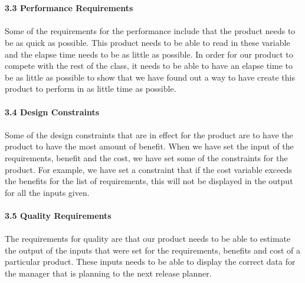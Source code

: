 \documentclass{article}
\begin{document}
\\
\\
\textbf{\hspace{4ex} 3.3 Performance Requirements}
\\
\\
Some of the requirements for the performance include that the product needs to be as quick as possible. This product needs to be able to read in these variable and the elapse time needs to be as little as possible. In order for our product to compete with the rest of the class, it needs to be able to have an elapse time to be as little as possible to show that we have found out a way to have create this product to perform in as little time as possible. 
\\
\\
\textbf{\hspace{4ex} 3.4 Design Constraints}
\\
\\
Some of the design constraints that are in effect for the product are to have the product to have the most amount of benefit. When we have set the input of the requirements, benefit and the cost, we have set some of the constraints for the product. For example, we have set a constraint that if the cost variable exceeds the benefits for the list of requirements, this will not be displayed in the output for all the inputs given.      
\\
\\
\textbf{\hspace{4ex} 3.5 Quality Requirements}
\\
\\
The requirements for quality are that our product needs to be able to estimate the output of the inputs that were set for the requirements, benefits and cost of a particular product. These inputs needs to be able to display the correct data for the manager that is planning to the next release planner. 
\\
\noindent
\\
\end{document}
